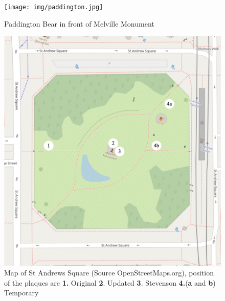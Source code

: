 \documentclass{scrartcl}
\begin{document}
\begin{appendices}
\begin{figure}
    \centering
    \texttt{[image: img/paddington.jpg]}
    \caption{Paddington Bear in front of Melville Monument}
    \label{fig:paddington}
\end{figure}

\begin{figure}
    \centering
    \includegraphics[width=1\linewidth]{img/map_numbered.png}
    \caption{Map of St Andrews Square (Source OpenStreetMaps.org), position of the plaques are \textbf{1.} Original \textbf{2}. Updated \textbf{3}. Stevenson \textbf{4.}(\textbf{a} and \textbf{b}) Temporary}
    \label{fig:st_andrews_map}
\end{figure}


\end{appendices}
\end{document}
